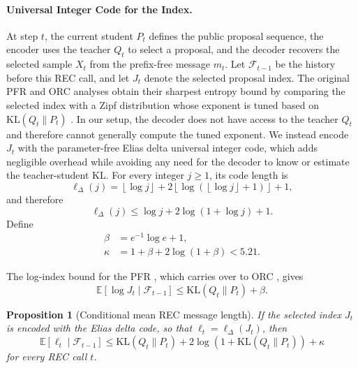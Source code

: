\documentclass{article}
\theoremstyle{plain}
\newtheorem{proposition}[theorem]{Proposition}
\theoremstyle{definition}
\theoremstyle{remark}
\begin{document}
\paragraph{Universal Integer Code for the Index.}
At step $t$, the current student $P_t$ defines the public proposal sequence, the encoder uses the teacher $Q_t$ to select a proposal, and the decoder recovers the selected sample $X_t$ from the prefix-free message $m_t$. Let $\mathcal F_{t-1}$ be the history before this REC call, and let $J_t$ denote the selected proposal index. The original PFR and ORC analyses obtain their sharpest entropy bound by comparing the selected index with a Zipf distribution whose exponent is tuned based on $\mathrm{KL}(Q_t\|P_t)$ \citep{li2018strong,theis2022algorithms}. In our setup, the decoder does not have access to the teacher $Q_t$ and therefore cannot generally compute the tuned exponent. We instead encode $J_t$ with the parameter-free Elias delta universal integer code, which adds negligible overhead while avoiding any need for the decoder to know or estimate the teacher-student KL. For every integer $j\geq1$, its code length is
\begin{equation}
    \ell_\Delta(j)
    =
    \left\lfloor\log j\right\rfloor
    +
    2\left\lfloor
      \log\!\left(\left\lfloor\log j\right\rfloor+1\right)
    \right\rfloor
    +1,
    \label{eq:elias-delta-length}
\end{equation}
and therefore
\begin{equation}
    \ell_\Delta(j)
    \leq
    \log j
    +2\log(1+\log j)
    +1.
    \label{eq:elias-pointwise-upper}
\end{equation}
Define
\begin{align}
    \beta
    &=
    e^{-1}\log e+1,
    \\
    \kappa
    &=
    1+\beta+2\log(1+\beta)
    <5.21.
    \label{eq:universal-code-constants}
\end{align}

The log-index bound for the PFR \citep{li2018strong}, which carries over to ORC \citep{theis2022algorithms}, gives
\begin{equation}
    \mathbb E[\log J_t\mid\mathcal F_{t-1}]
    \leq
    \mathrm{KL}(Q_t\|P_t)+\beta.
    \label{eq:pfr-expected-log-index}
\end{equation}

\begin{proposition}[Conditional mean REC message length]
\label{prop:conditional-mean-rec-message}
If the selected index $J_t$ is encoded with the Elias delta code, so that $\ell_t=\ell_\Delta(J_t)$, then
\begin{equation}\label{eq:orc_block}
\mathbb{E}[\ell_t\mid\mathcal F_{t-1}]
\le
\mathrm{KL}(Q_t\|P_t)
+2\log\!\left(1+\mathrm{KL}(Q_t\|P_t)\right)
+\kappa
\end{equation}
for every REC call $t$.
\end{proposition}
\end{document}
